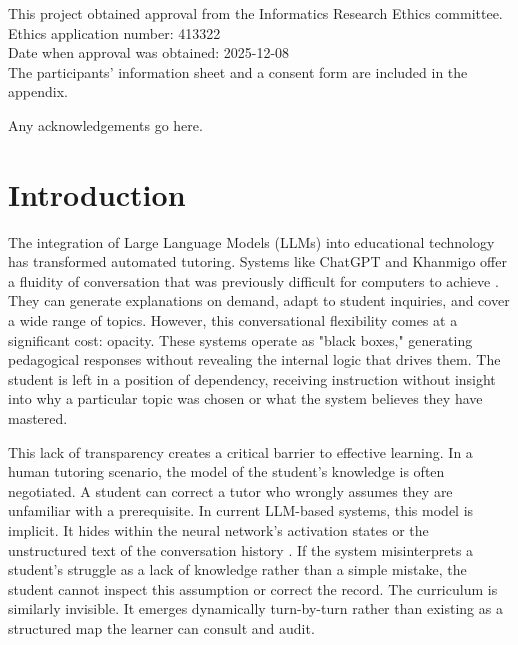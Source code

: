 \documentclass[logo,bsc,singlespacing,parskip,online]{infthesis}
\begin{document}
\begin{preliminary}
\begin{ethics}
This project obtained approval from the Informatics Research Ethics committee.\\
Ethics application number: 413322\\
Date when approval was obtained: 2025-12-08\\
The participants' information sheet and a consent form are included in the appendix.

\standarddeclaration
\end{ethics}


\begin{acknowledgements}
Any acknowledgements go here.
\end{acknowledgements}


\tableofcontents
\end{preliminary}


\chapter{Introduction}

The integration of Large Language Models (LLMs) into educational technology has transformed automated tutoring. Systems like ChatGPT and Khanmigo offer a fluidity of conversation that was previously difficult for computers to achieve \citep{openai2025studymode,khanmigoParents}. They can generate explanations on demand, adapt to student inquiries, and cover a wide range of topics. However, this conversational flexibility comes at a significant cost: opacity. These systems operate as "black boxes," generating pedagogical responses without revealing the internal logic that drives them. The student is left in a position of dependency, receiving instruction without insight into why a particular topic was chosen or what the system believes they have mastered.

This lack of transparency creates a critical barrier to effective learning. In a human tutoring scenario, the model of the student's knowledge is often negotiated. A student can correct a tutor who wrongly assumes they are unfamiliar with a prerequisite. In current LLM-based systems, this model is implicit. It hides within the neural network's activation states or the unstructured text of the conversation history \citep{chen2024chattutor}. If the system misinterprets a student's struggle as a lack of knowledge rather than a simple mistake, the student cannot inspect this assumption or correct the record. The curriculum is similarly invisible. It emerges dynamically turn-by-turn rather than existing as a structured map the learner can consult and audit.
\end{document}
